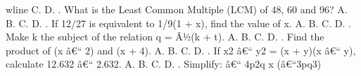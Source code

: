 \documentclass{article}
\begin{document}
\begin{multicols}{2}
wline \indent C. \newline \indent D.  \newline{}. What is the Least Common Multiple (LCM) of 48, 60 and 96? \newline \indent A. \newline \indent B. \newline \indent C. \newline \indent D.  \newline{}. If 12/27 is equivalent to 1/9(1 + x), find the value of x. \newline \indent A. \newline \indent B. \newline \indent C. \newline \indent D.  \newline{}. Make k the subject of the relation q = Â½(k + t). \newline \indent A. \newline \indent B. \newline \indent C. \newline \indent D.  \newline{}. Find the product of (x â€“ 2) and (x + 4). \newline \indent A. \newline \indent B. \newline \indent C. \newline \indent D.  \newline{}. If x2 â€“ y2 = (x + y)(x â€“ y), calculate 12.632 â€“ 2.632. \newline \indent A. \newline \indent B. \newline \indent C. \newline \indent D.  \newline{}. Simplify: â€“ 4p2q x (â€“3pq3) 
\end{multicols}
\end{document}
